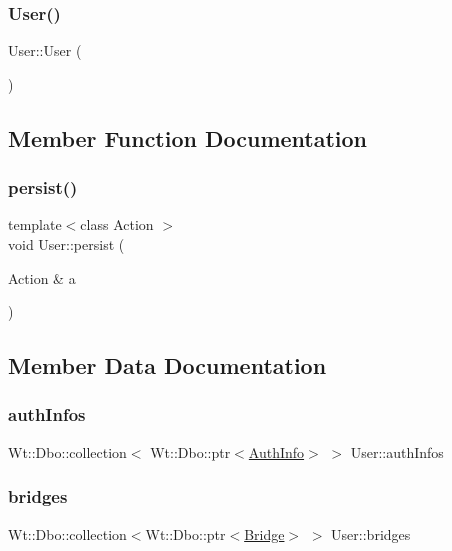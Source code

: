 \subsubsection{\texorpdfstring{User()}{User()}}
{\footnotesize\ttfamily User\+::\+User (\begin{DoxyParamCaption}{ }\end{DoxyParamCaption})}



\subsection{Member Function Documentation}
\mbox{\label{class_user_a626b516f8e54e0b98c4b20c488de01b8}} 
\subsubsection{\texorpdfstring{persist()}{persist()}}
{\footnotesize\ttfamily template$<$class Action $>$ \\
void User\+::persist (\begin{DoxyParamCaption}\item[{Action \&}]{a }\end{DoxyParamCaption})\hspace{0.3cm}{\ttfamily [inline]}}



\subsection{Member Data Documentation}
\mbox{\label{class_user_ae3f58fe31642f514288705f4081031b6}} 
\subsubsection{\texorpdfstring{auth\+Infos}{authInfos}}
{\footnotesize\ttfamily Wt\+::\+Dbo\+::collection$<$ Wt\+::\+Dbo\+::ptr$<$\hyperlink{_user_8h_a3c0a51912624b328e151e753cb0d1dd3}{Auth\+Info}$>$ $>$ User\+::auth\+Infos}

\mbox{\label{class_user_a19170eac8428770570d1e0b826562131}} 
\subsubsection{\texorpdfstring{bridges}{bridges}}
{\footnotesize\ttfamily Wt\+::\+Dbo\+::collection$<$Wt\+::\+Dbo\+::ptr$<$\hyperlink{class_bridge}{Bridge}$>$ $>$ User\+::bridges}

